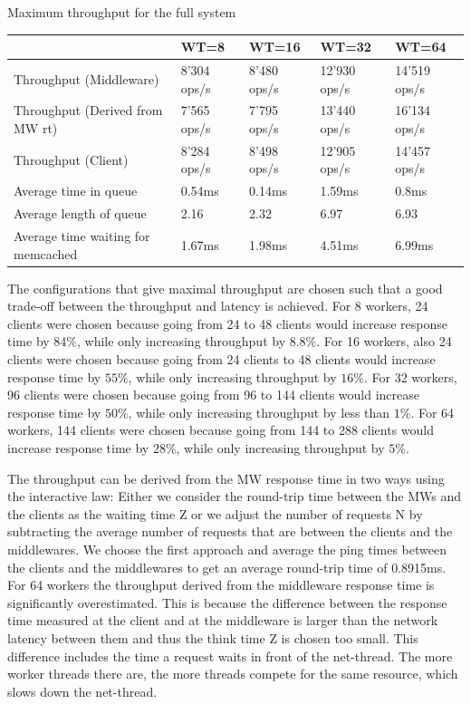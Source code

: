 \begin{center}
	{Maximum throughput for the full system}
	\begin{tabular}{|l|p{2.1cm}|p{2.1cm}|p{2.1cm}|p{2.1cm}|}
		\hline                                            & WT=8 & WT=16 & WT=32 & WT=64 \\ 
		\hline Throughput (Middleware)                    & 8'304 ops/s & 8'480 ops/s & 12'930 ops/s & 14'519 ops/s	       \\ 
		\hline Throughput (Derived from MW rt)            & 7'565 ops/s & 7'795 ops/s & 13'440 ops/s & 16'134 ops/s \\ 
		\hline Throughput (Client)                        &8'284 ops/s & 8'498 ops/s & 12'905 ops/s & 14'457 ops/s       \\ 
		\hline Average time in queue                      &0.54ms&0.14ms&1.59ms&0.8ms	 \\ 
		\hline Average length of queue                    &2.16 & 2.32 & 6.97 & 6.93 \\ 
		\hline Average time waiting for memcached         & 1.67ms  & 1.98ms & 4.51ms & 6.99ms	 \\ 
		\hline 
	\end{tabular}
\end{center}
The configurations that give maximal throughput are chosen such that a good trade-off between the throughput and latency is achieved. For 8 workers, 24 clients were chosen because going from 24 to 48 clients would increase response time by $84\%$, while only increasing throughput by $8.8\%$. For 16 workers, also 24 clients were chosen because going from 24 clients to 48 clients would increase response time by $55\%$, while only increasing throughput by $16\%$. For 32 workers, 96 clients were chosen because going from 96 to 144 clients would increase response time by $50\%$, while only increasing throughput by less than $1\%$. For 64 workers, 144 clients were chosen because going from 144 to 288 clients would increase response time by $28\%$, while only increasing throughput by $5\%$.

The throughput can be derived from the MW response time in two ways using the interactive law: Either we consider the round-trip time between the MWs and the clients as the waiting time Z or we adjust the number of requests N by subtracting the average number of requests that are between the clients and the middlewares. We choose the first approach and average the ping times between the clients and the middlewares to get an average round-trip time of 0.8915ms. 
For 64 workers the throughput derived from the middleware response time is significantly overestimated. This is because the difference between the response time measured at the client and at the middleware is larger than the network latency between them and thus the think time Z is chosen too small. This difference includes the time a request waits in front of the net-thread. The more worker threads there are, the more threads compete for the same resource, which slows down the net-thread.

